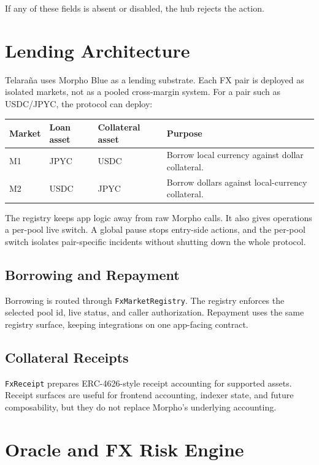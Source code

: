 \documentclass[11pt]{article}
\newcommand{\protocol}{Telara\~na}
\begin{document}
If any of these fields is absent or disabled, the hub rejects the action.

\section{Lending Architecture}

\protocol{} uses Morpho Blue as a lending substrate. Each FX pair is deployed
as isolated markets, not as a pooled cross-margin system. For a pair such as
USDC/JPYC, the protocol can deploy:

\begin{center}
\begin{tabular}{llll}
\toprule
Market & Loan asset & Collateral asset & Purpose \\
\midrule
M1 & JPYC & USDC & Borrow local currency against dollar collateral. \\
M2 & USDC & JPYC & Borrow dollars against local-currency collateral. \\
\bottomrule
\end{tabular}
\end{center}

The registry keeps app logic away from raw Morpho calls. It also gives
operations a per-pool live switch. A global pause stops entry-side actions, and
the per-pool switch isolates pair-specific incidents without shutting down the
whole protocol.

\subsection{Borrowing and Repayment}

Borrowing is routed through \texttt{FxMarketRegistry}. The registry enforces
the selected pool id, live status, and caller authorization. Repayment uses the
same registry surface, keeping integrations on one app-facing contract.

\subsection{Collateral Receipts}

\texttt{FxReceipt} prepares ERC-4626-style receipt accounting for supported
assets. Receipt surfaces are useful for frontend accounting, indexer state, and
future composability, but they do not replace Morpho's underlying accounting.

\section{Oracle and FX Risk Engine}
\end{document}
